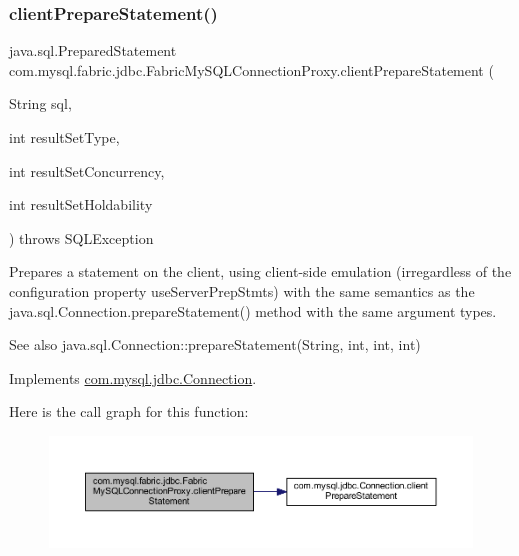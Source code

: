 \subsubsection{\texorpdfstring{client\+Prepare\+Statement()}{clientPrepareStatement()}\hspace{0.1cm}{\footnotesize\ttfamily [5/6]}}
{\footnotesize\ttfamily java.\+sql.\+Prepared\+Statement com.\+mysql.\+fabric.\+jdbc.\+Fabric\+My\+S\+Q\+L\+Connection\+Proxy.\+client\+Prepare\+Statement (\begin{DoxyParamCaption}\item[{String}]{sql,  }\item[{int}]{result\+Set\+Type,  }\item[{int}]{result\+Set\+Concurrency,  }\item[{int}]{result\+Set\+Holdability }\end{DoxyParamCaption}) throws S\+Q\+L\+Exception}

Prepares a statement on the client, using client-\/side emulation (irregardless of the configuration property \textquotesingle{}use\+Server\+Prep\+Stmts\textquotesingle{}) with the same semantics as the java.\+sql.\+Connection.\+prepare\+Statement() method with the same argument types.

\begin{DoxySeeAlso}{See also}
java.\+sql.\+Connection\+::prepare\+Statement(\+String, int, int, int) 
\end{DoxySeeAlso}


Implements \mbox{\hyperlink{interfacecom_1_1mysql_1_1jdbc_1_1_connection_af2c3e5b2cd7768c4fdf7ca4e75558bbf}{com.\+mysql.\+jdbc.\+Connection}}.

Here is the call graph for this function\+:\nopagebreak
\begin{figure}[H]
\begin{center}
\leavevmode
\includegraphics[width=350pt]{classcom_1_1mysql_1_1fabric_1_1jdbc_1_1_fabric_my_s_q_l_connection_proxy_af87ed2e4ae29bbf51b90adf202a61c49_cgraph}
\end{center}
\end{figure}
\mbox{\label{classcom_1_1mysql_1_1fabric_1_1jdbc_1_1_fabric_my_s_q_l_connection_proxy_ac36e9430178828a18476f6ef8cd0b28f}} 
